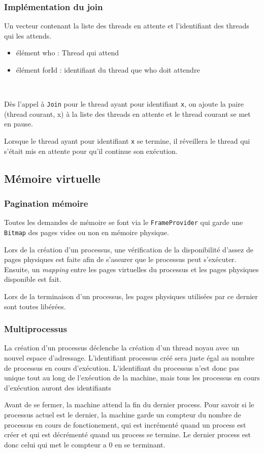 \documentclass{article}
\begin{document}
		\subsubsection{Implémentation du join}
			Un vecteur contenant la liste des threads en attente et l'identifiant des threads qui les attends.
				\begin{itemize}
					\item élément who : Thread qui attend
					\item élément forId : identifiant du thread que who doit attendre
				\end{itemize}
			~\par{Dès l'appel à \texttt{Join} pour le thread ayant pour identifiant \texttt{x}, on ajoute la paire (thread courant, x) à la liste des threads en attente et le thread courant se met en pause. 
			~\par{Lorsque le thread ayant pour identifiant \texttt{x} se termine, il réveillera le thread qui s'était mis en attente pour qu'il continue son exécution.}

	\subsection{Mémoire virtuelle}
		\subsubsection{Pagination mémoire}
			{Toutes les demandes de mémoire se font via le \texttt{FrameProvider} qui garde une \texttt{Bitmap} des pages vides ou non en mémoire physique.}
			~\par{Lors de la création d'un processus, une vérification de la disponibilité d'assez de pages physiques est faite afin de s'assurer que le processus peut s'exécuter. Ensuite, un \emph{mapping} entre les pages virtuelles du processus et les pages physiques disponible est fait.}
			~\par{Lors de la terminaison d'un processus, les pages physiques utilisées par ce dernier sont toutes libérées.}
		\subsubsection{Multiprocessus}
			{La création d'un processus déclenche la création d'un thread noyau avec un nouvel espace d'adressage. L'identifiant processus créé sera juste égal au nombre de processus en cours d'exécution. L'identifiant du processus n'est donc pas unique tout au long de l'exécution de la machine, mais tous les processus en cours d'exécution auront des identifiants}
			~\par{Avant de se fermer, la machine attend la fin du dernier process. Pour savoir si le processus actuel est le dernier, la machine garde un compteur du nombre de processus en cours de fonctionement, qui est incrémenté quand un process est créer et qui est décrémenté quand un process se termine. Le dernier process est donc celui qui met le compteur a $0$ en se terminant.}

}
\end{document}
